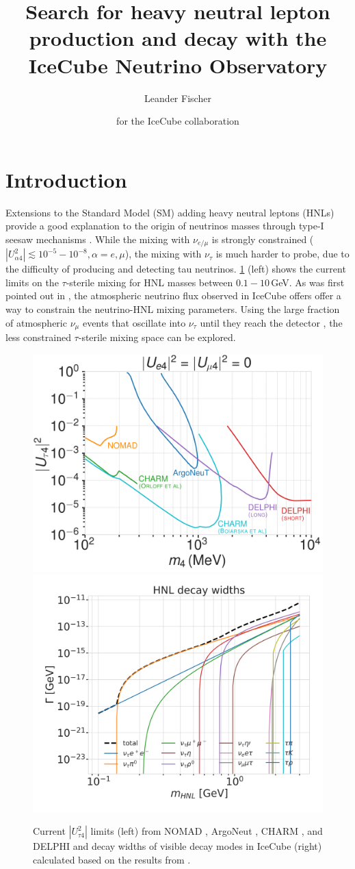 \documentclass[a4paper,11pt]{article}
\title{Search for heavy neutral lepton production and decay with the IceCube Neutrino Observatory}
\author*[a]{Leander Fischer}
\author{for the IceCube collaboration}
\affiliation[a]{DESY, D-15738 Zeuthen, Germany}
\begin{document}
\maketitle


\section{Introduction}

Extensions to the Standard Model (SM) adding heavy neutral leptons (HNLs) provide a good explanation to the origin of neutrinos masses through type-I seesaw mechanisms \cite{10.1143/PTP.64.1103}. While the mixing with $\nu_{e/\mu}$ is strongly constrained ($|U_{\alpha4}^2| \lesssim 10^{-5}-10^{-8}, \alpha=e,\mu$), the mixing with $\nu_{\tau}$ is much harder to probe, due to the difficulty of producing and detecting tau neutrinos. \cref{fig:hnl_limits_and_decay_widths} (left) shows the current limits on the $\tau$-sterile mixing for HNL masses between $0.1-10$\,GeV. As was first pointed out in \cite{Coloma:2017ppo}, the atmospheric neutrino flux observed in IceCube offers offer a way to constrain the neutrino-HNL mixing parameters. Using the large fraction of atmospheric $\nu_{\mu}$ events that oscillate into $\nu_{\tau}$ until they reach the detector \cite{IceCube:2019dqi}, the less constrained $\tau$-sterile mixing space can be explored.

\begin{figure}[h]
  \includegraphics[width=.50\linewidth]{figures/UtauN_custom_plots_LF_grid_white.png}
  \includegraphics[width=.47\linewidth]{figures/hnl_decay_widths_log.png}
  \label{fig:hnl_visible_decay_widths}
  \caption{Current $|U_{\tau4}^2|$ limits (left) from NOMAD \cite{NOMAD:2001eyx}, ArgoNeut \cite{ArgoNeuT:2021clc}, CHARM \cite{Orloff:2002de, Boiarska:2021yho}, and DELPHI \cite{DELPHI:1996qcc} and decay widths of visible decay modes in IceCube (right) calculated based on the results from \cite{Gorbunov:2007ak}.}
  \label{fig:hnl_limits_and_decay_widths}
\end{figure}
\end{document}
